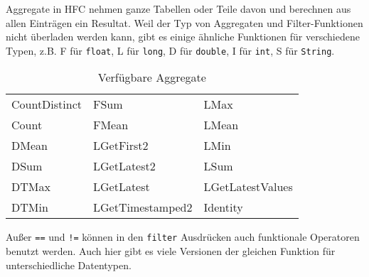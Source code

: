 Aggregate in HFC nehmen ganze Tabellen oder Teile davon und berechnen aus allen
Einträgen ein Resultat. Weil der Typ von Aggregaten und Filter-Funktionen nicht
überladen werden kann, gibt es einige ähnliche Funktionen für verschiedene
Typen, z.B. F für \texttt{float}, L für \texttt{long}, D für \texttt{double}, I
für \texttt{int}, S für \texttt{String}.

\begin{table}[htbp]
  \centering
 \begin{tabular}{lll}
   CountDistinct&  FSum&             LMax\\
   Count&          FMean&            LMean\\
   DMean&          LGetFirst2&       LMin\\
   DSum&           LGetLatest2&      LSum\\
   DTMax&          LGetLatest&       LGetLatestValues\\
   DTMin&          LGetTimestamped2& Identity     \\
 \end{tabular}
  \caption{Verfügbare Aggregate}
  \label{tab:hfcaggregates}
\end{table}

Außer \verb|==| und \verb|!=| können in den \texttt{filter} Ausdrücken
auch funktionale Operatoren benutzt werden. Auch hier gibt es viele
Versionen der gleichen Funktion für unterschiedliche Datentypen.

